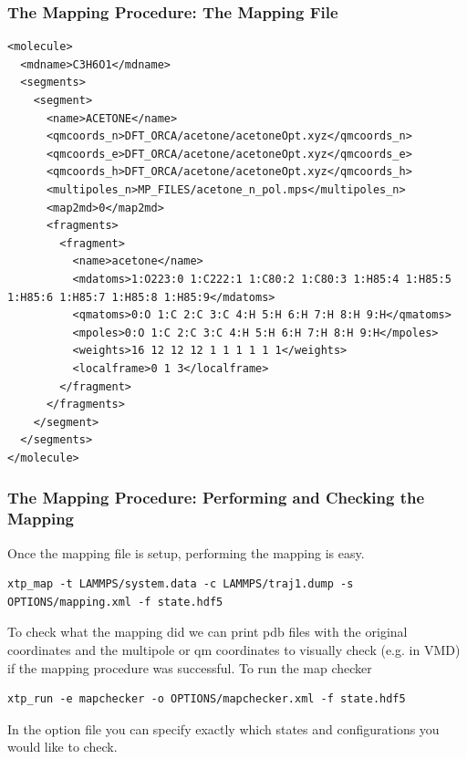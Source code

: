 \documentclass[t,aspectratio=169, 8pt]{beamer}
\begin{document}
\begin{frame}[fragile]
  \frametitle{The Mapping Procedure: The Mapping File}

  \begin{verbatim}
<molecule>
  <mdname>C3H6O1</mdname>
  <segments>
    <segment>
      <name>ACETONE</name>
      <qmcoords_n>DFT_ORCA/acetone/acetoneOpt.xyz</qmcoords_n>
      <qmcoords_e>DFT_ORCA/acetone/acetoneOpt.xyz</qmcoords_e>
      <qmcoords_h>DFT_ORCA/acetone/acetoneOpt.xyz</qmcoords_h>
      <multipoles_n>MP_FILES/acetone_n_pol.mps</multipoles_n>
      <map2md>0</map2md>
      <fragments>
        <fragment>
          <name>acetone</name>
          <mdatoms>1:O223:0 1:C222:1 1:C80:2 1:C80:3 1:H85:4 1:H85:5 1:H85:6 1:H85:7 1:H85:8 1:H85:9</mdatoms>
          <qmatoms>0:O 1:C 2:C 3:C 4:H 5:H 6:H 7:H 8:H 9:H</qmatoms>
          <mpoles>0:O 1:C 2:C 3:C 4:H 5:H 6:H 7:H 8:H 9:H</mpoles>
          <weights>16 12 12 12 1 1 1 1 1 1</weights>
          <localframe>0 1 3</localframe>
        </fragment>
      </fragments>
    </segment>
  </segments>
</molecule>
  \end{verbatim}
\end{frame}

\begin{frame}[fragile]
  \frametitle{The Mapping Procedure: Performing and Checking the Mapping}
  Once the mapping file is setup, performing the mapping is easy.

  \begin{verbatim}
xtp_map -t LAMMPS/system.data -c LAMMPS/traj1.dump -s OPTIONS/mapping.xml -f state.hdf5
  \end{verbatim}

  To check what the mapping did we can print pdb files with the original coordinates and the multipole or qm coordinates to visually check (e.g. in VMD) if the mapping procedure was successful. To run the map checker
  \begin{verbatim}
xtp_run -e mapchecker -o OPTIONS/mapchecker.xml -f state.hdf5
  \end{verbatim}
  In the option file you can specify exactly which states and configurations you would like to check.
\end{frame}
\end{document}

